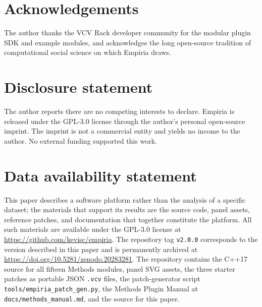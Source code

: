 \section{Acknowledgements}\label{acknowledgements}

The author thanks the VCV Rack developer community for the modular
plugin SDK and example modules, and acknowledges the long
open-source tradition of computational social science on which
Empiria draws.

\section{Disclosure statement}\label{disclosure-statement}

The author reports there are no competing interests to declare.
Empiria is released under the GPL-3.0 license through the author's
personal open-source imprint. The imprint is not a commercial
entity and yields no income to the author. No external funding
supported this work.

\section{Data availability statement}\label{data-availability-statement}

This paper describes a software platform rather than the analysis
of a specific dataset; the materials that support its results are
the source code, panel assets, reference patches, and documentation
that together constitute the platform. All such materials are
available under the GPL-3.0 license at
\url{https://github.com/kevisc/empiria}. The repository tag
\texttt{v2.0.0} corresponds to the version described in this paper
and is permanently archived at
\url{https://doi.org/10.5281/zenodo.20283281}. The repository
contains the C++17 source for all fifteen Methods modules, panel
SVG assets, the three starter patches as portable JSON
\texttt{.vcv} files, the patch-generator script
\texttt{tools/empiria\_patch\_gen.py}, the Methods Plugin Manual at
\texttt{docs/methods\_manual.md}, and the source for this paper.
